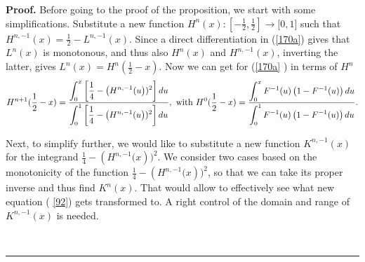 \documentclass[onecolumn]{article}
\providecommand{\dint}{\displaystyle\int}
\newenvironment{proof}[1][Proof]{\noindent\textbf{#1.} }{\ \rule{0.5em}{0.5em}}
\renewcommand{\dint}{\displaystyle\int}
\begin{document}
\begin{proof}
Before going to the proof of the proposition, we start with some
simplifications. Substitute a new function $H^{n}(x):[-\frac{1}{2},\frac{1}{2%
}]\rightarrow \lbrack 0,1]$ such that $H^{n,-1}(x)=\frac{1}{2}-L^{n,-1}(x)$.
Since a direct differentiation in (\ref{170a}) gives that $L^{n}(x)$ is
monotonous, and thus also $H^{n}(x)$ and $H^{n,-1}(x)$, inverting the
latter, gives $L^{n}(x)=H^{n}(\frac{1}{2}-x)$. Now we can get for (\ref{170a}%
) in terms of $H^{n}$ 
\begin{equation}
H^{n+1}(\frac{1}{2}-x)=\frac{\dint\nolimits_{0}^{x}\left[ \frac{1}{4}-\left(
H^{n,-1}(u\right) )^{2}\right] du}{\dint\nolimits_{0}^{1}\left[ \frac{1}{4}%
-\left( H^{n,-1}(u\right) )^{2}\right] du},\text{ with }H^{0}(\frac{1}{2}-x)=%
\frac{\dint\nolimits_{0}^{x}F^{-1}(u)\left( 1-F^{-1}(u)\right) du}{%
\dint\nolimits_{0}^{1}F^{-1}(u)\left( 1-F^{-1}(u)\right) du}.  \label{92}
\end{equation}

Next, to simplify further, we would like to substitute a new function $%
K^{n,-1}(x)$ for the integrand $\frac{1}{4}-\left( H^{n,-1}(x\right) )^{2}$.
We consider two cases based on the monotonicity of the function $\frac{1}{4}%
-\left( H^{n,-1}(x\right) )^{2}$, so that we can take its proper inverse and
thus find $K^{n}(x)$. That would allow to effectively see what new equation (%
\ref{92}) gets transformed to. A right control of the domain and range of $%
K^{n,-1}(x)$ is needed.


\end{proof}
\end{document}
